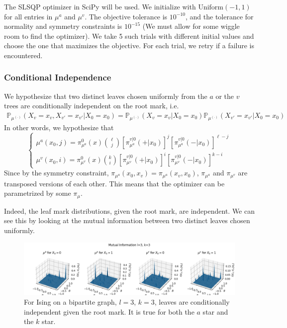 \documentclass[12pt]{article}
\numberwithin{equation}{section}
\begin{document}
The SLSQP optimizer in SciPy will be used. We initialize with $\text{Uniform}(-1, 1)$ for all entries in $\mu^a$ and $\mu^v$.
The objective tolerance is $10^{-10}$, and the tolerance for normality and symmetry constraints is $10^{-15}$ (We must allow for some
wiggle room to find the optimizer). We take 5 such trials with different initial values and choose the one that maximizes the objective.
For each trial, we retry if a failure is encountered.

\subsubsection{Conditional Independence}

We hypothesize that two distinct leaves chosen uniformly from the $a$ or the $v$ trees are conditionally independent on the root mark, i.e.
\begin{align*}
    \mathbb{P}_{\mu^{(\cdot)}}(X_v=x_v, X_{v'}=x_{v'}|X_0=x_0) = \mathbb{P}_{\mu^{(\cdot)}}(X_v=x_v|X_0=x_0)\mathbb{P}_{\mu^{(\cdot)}}(X_{v'}=x_{v'}|X_0=x_0)
\end{align*}
In other words, we hypothesize that
\begin{equation*}
    \begin{cases}
        \mu^a(x_0, j)=\pi_{\mu^a}^0(x){\ell\choose j}[\pi_{\mu^a}^{v|0}(+|x_0)]^j[\pi_{\mu^a}^{v|0}(-|x_0)]^{\ell-j} \\
        \mu^v(x_0, i)=\pi_{\mu^v}^0(x){k\choose i}[\pi_{\mu^v}^{v|0}(+|x_0)]^i[\pi_{\mu^v}^{v|0}(-|x_0)]^{k-i}
    \end{cases}
\end{equation*}
Since by the symmetry constraint, $\pi_{\mu^a}(x_0, x_v)=\pi_{\mu^a}(x_v, x_0)$, $\pi_{\mu^a}$ and $\pi_{\mu^v}$ are transposed versions
of each other. This means that the optimizer can be parametrized by some $\pi_\mu$.

Indeed, the leaf mark distributions, given the root mark, are independent. We can see this by looking at the mutual information
between two distinct leaves chosen uniformly.

\begin{figure}[h]
    \centering
    \includegraphics[width=16cm]{img/Ising_bptt/CI_l3_k3.png}
    \caption{For Ising on a bipartite graph, $l=3$, $k=3$, leaves are conditionally independent given the root mark. It is true for both the $a$ star
        and the $k$ star.}
    \label{Eq.ISBP-CI-l3-k3}
\end{figure}
\end{document}
